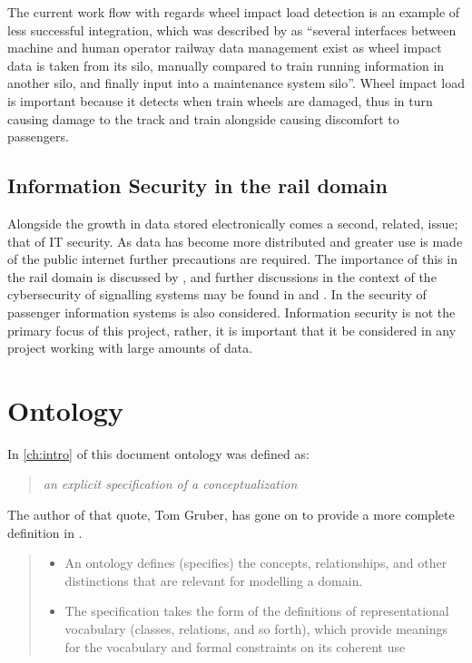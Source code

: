 The current work flow with regards wheel impact load detection is an example of less successful integration, which was described by \citet{Tutcher2015} as  ``several interfaces between machine and human operator railway data management exist as wheel impact data is taken from its silo, manually compared to train running information in another silo, and finally input into a maintenance system silo''. Wheel impact load is important because it detects when train wheels are damaged, thus in turn causing damage to the track and train alongside causing discomfort to passengers.

\subsection{Information Security in the rail domain}

Alongside the growth in data stored electronically comes a second, related, issue; that of IT security. As data has become more distributed and greater use is made of the public internet further precautions are required. The importance of this in the rail domain is discussed by \citet{Depar2016}, and further discussions in the context of the cybersecurity of signalling systems may be found in \citep{BloomField2016} and \citep{Chen2015}. In \citet{Chen2015} the security of passenger information systems is also considered. Information security is not the primary focus of this project, rather, it is important that it be considered in any project working with large amounts of data.

\section{Ontology}\label{onto}
In \autoref{ch:intro} of this document ontology was defined as: 
\begin{quote}
\emph{an explicit specification of a conceptualization}
\end{quote}
The author of that quote, Tom Gruber, has gone on to provide a more complete definition in \citep{Gru09}. 

\begin{quote}
\begin{itemize}
\item An ontology defines (specifies) the concepts, relationships, and other distinctions that are relevant for modelling a domain.
\item The specification takes the form of the definitions of representational vocabulary (classes, relations, and so forth), which provide meanings for the vocabulary and formal constraints on its coherent use
\end{itemize}
\end{quote}

